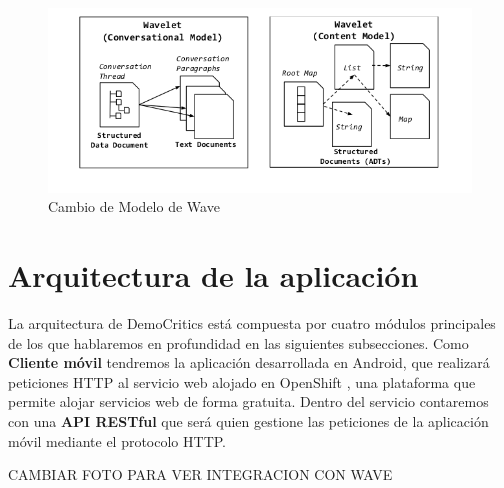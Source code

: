 	
	\begin{figure}[H]
	  \centering
	    \includegraphics[keepaspectratio, scale=0.6]{Media/Captures/waveDataModel.png}
	  \caption{Cambio de Modelo de Wave}
	  \label{fig:wave_swellRT}
	\end{figure}

\section{Arquitectura de la aplicación}

La arquitectura de DemoCritics está compuesta por cuatro módulos principales de los que hablaremos en profundidad en las siguientes subsecciones. Como \textbf{Cliente móvil} tendremos la aplicación desarrollada en Android, que realizará peticiones HTTP al servicio web alojado en OpenShift \cite{ref:OpenShift}, una plataforma que permite alojar servicios web de forma gratuita. Dentro del servicio contaremos con una \textbf{API RESTful} que será quien gestione las peticiones de la aplicación móvil mediante el protocolo HTTP.

CAMBIAR FOTO PARA VER INTEGRACION CON WAVE

